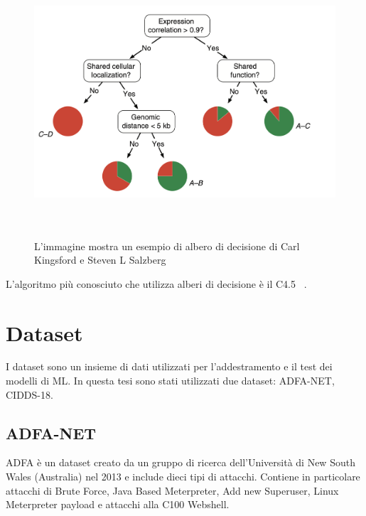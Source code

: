 \begin{figure}[htpb]
    \centering
    \includegraphics[width=\textwidth,height=10cm,keepaspectratio=true]{img/albero_di_decisione.png}
    \caption{
        L'immagine mostra un esempio di albero di decisione di Carl Kingsford e Steven L Salzberg ~\cite{kingsfordWhatAreDecision2008}
    }
    \label{fig:decision_tree}
\end{figure}



L'algoritmo più conosciuto che utilizza alberi di decisione è il C4.5 ~\cite{salzbergC4ProgramsMachine1994}.


\section{Dataset}

I dataset sono un insieme di dati utilizzati per l'addestramento e il test dei modelli di ML. In questa tesi sono stati utilizzati due dataset: ADFA-NET, CIDDS-18.

\subsection{ADFA-NET}

ADFA è un dataset creato da un gruppo di ricerca dell'Università di New South Wales (Australia) nel 2013 e include dieci tipi di attacchi. Contiene in particolare attacchi di Brute Force, Java Based Meterpreter, Add new Superuser, Linux Meterpreter payload e attacchi alla C100 Webshell. ~\cite{sharafaldinGeneratingNewIntrusion2018}

